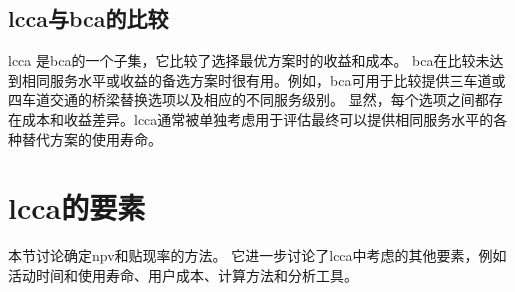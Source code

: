 \subsection{\texorpdfstring{\acrlong*{lcca}}{全生命周期成本分析}与\texorpdfstring{\acrfull*{bca}}{效益成本分析}的比较}

\acrlong*{lcca} 是\acrfull*{bca}的一个子集，它比较了选择最优方案时的收益和成本。 \acrlong*{bca}在比较未达到相同服务水平或收益的备选方案时很有用。例如，\acrlong*{bca}可用于比较提供三车道或四车道交通的桥梁替换选项以及相应的不同服务级别。 显然，每个选项之间都存在成本和收益差异。\acrlong*{lcca}通常被单独考虑用于评估最终可以提供相同服务水平的各种替代方案的使用寿命。

\section[全生命周期成本分析的要素]{\acrlong*{lcca}的要素}
本节讨论确定\acrlong*{npv}和贴现率的方法。 它进一步讨论了\acrlong*{lcca}中考虑的其他要素，例如活动时间和使用寿命、用户成本、计算方法和分析工具。

